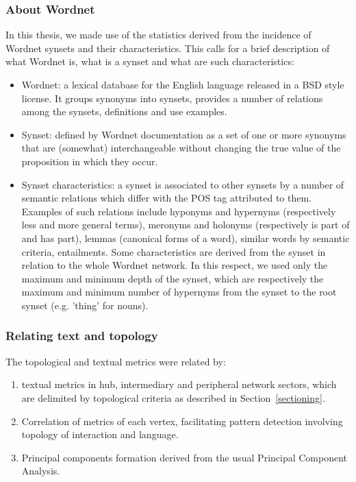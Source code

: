 \subsubsection{About Wordnet}
In this thesis, we made use of the statistics derived from the incidence of Wordnet synsets and their characteristics.
This calls for a brief description of what Wordnet is, what is a synset and what are such characteristics:
\begin{itemize}
\item Wordnet: a lexical database for the English language released in a BSD style license. It groups synonyms into synsets, provides a number of relations among the synsets, definitions and use examples.
\item Synset: defined by Wordnet documentation as a set of one or more synonyms that are (somewhat) interchangeable without changing the true value of the proposition in which they occur.
\item Synset characteristics: a synset is associated to other synsets by a number of semantic relations which differ with the POS tag attributed to them.
Examples of such relations include hyponyms and hypernyms (respectively less and more general terms), meronyms and holonyms (respectively is part of and has part), lemmas (canonical forms of a word), similar words by semantic criteria, entailments.
Some characteristics are derived from the synset in relation to the whole Wordnet network.
In this respect, we used only the maximum and minimum depth of the synset, which are respectively the maximum and minimum number of hypernyms from the synset to the root synset (e.g. 'thing' for nouns).
\end{itemize}

\subsubsection{Relating text and topology}\label{sec:ks}
The topological and textual metrics were related by:
\begin{enumerate}
\item textual metrics in hub, intermediary and peripheral network sectors, which are delimited by topological criteria as described in Section~\ref{sectioning}.
\item Correlation of metrics of each vertex, facilitating pattern detection involving topology of interaction and language.
\item Principal components formation derived from the usual Principal Component Analysis.
\end{enumerate}

